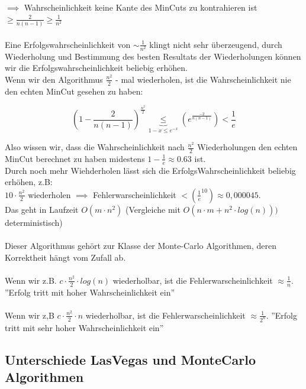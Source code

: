 \documentclass{article}
\begin{document}
$\implies$ Wahrscheinlichkeit keine Kante des MinCuts zu kontrahieren ist $\geq \frac{2}{n(n-1)} \geq \frac{1}{n^2}$\\
\\
Eine Erfolgswahrscheinlichkeit von $\sim  \frac{1}{n^2}$ klingt nicht sehr überzeugend, durch Wiederholung und Bestimmung des besten Resultats der
Wiederholungen können wir die Erfolgswahrscheinlichkeit beliebig erhöhen.\\
Wenn wir den Algorithmus $\frac{n^2}{2}$ - mal wiederholen, ist die Wahrscheinlichkeit nie den echten MinCut gesehen zu haben:

\[(1- \frac{2}{n(n-1)})^{\frac{n^2}{2}} \underbrace{\leq}_{1-x \leq e^{-x}} (e^{\frac{-2}{n(n-1)}}) < \frac{1}{e} \] 


Also wissen wir, dass die Wahrscheinlichkeit nach $\frac{n^2}{2}$ Wiederholungen den echten MinCut berechnet zu haben midestens $1- \frac{1}{e} \approx 0.63$
ist.\\

Durch noch mehr Wiehderholen lässt sich die ErfolgsWahrscheinlichkeit beliebig erhöhen, z.B:\\

$10 \cdot \frac{n^2}{2}$ wiederholen $\implies$ Fehlerwarscheinlichkeit $<(\frac{1}{e}^{10}) \approx 0,000045$.\\
Das geht in Laufzeit $O(m \cdot n^2)$ (Vergleiche mit $O(n \cdot m + n^2 \cdot log(n)))$ deterministisch)\\
\\
Dieser Algorithmus gehört zur Klasse der Monte-Carlo Algorithmen, deren Korrektheit hängt vom Zufall ab.\\
\\
Wenn wir z.B. $ c \cdot \frac{n^2}{2} \cdot log(n)$ wiederholbar, ist die Fehlerwarscheinlichkeit $\approx \frac{1}{n}$. ''Erfolg tritt mit hoher Wahrscheinlichkeit ein''\\
\\
Wenn wir z,B $ c \cdot \frac{n^2}{2} \cdot n$ wiederholbar, ist die Fehlerwarscheinlichkeit $\approx \frac{1}{2^n}$. ''Erfolg tritt mit sehr hoher Wahrscheinlichkeit ein''\\


\subsection{Unterschiede LasVegas und MonteCarlo Algorithmen}
\end{document}
